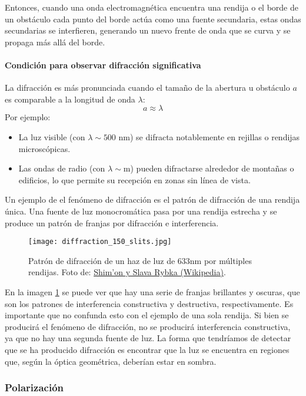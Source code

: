 Entonces, cuando una onda electromagnética encuentra una rendija o el borde de un obstáculo cada punto del borde actúa como una fuente secundaria, estas ondas secundarias se interfieren, generando un nuevo frente de onda que se curva y se propaga más allá del borde.

\paragraph{Condición para observar difracción significativa}

La difracción es más pronunciada cuando el tamaño de la abertura u obstáculo \(a\) es comparable a la longitud de onda \(\lambda\):
\[
a \approx \lambda
\]
Por ejemplo:
\begin{itemize}
  \item La luz visible (con \(\lambda \sim 500 \text{ nm}\)) se difracta notablemente en rejillas o rendijas microscópicas.
  \item Las ondas de radio (con \(\lambda \sim \text{m}\)) pueden difractarse alrededor de montañas o edificios, lo que permite su recepción en zonas sin línea de vista.
\end{itemize}

Un ejemplo de el fenómeno de difracción es el patrón de difracción de una rendija única. Una fuente de luz monocromática pasa por una rendija estrecha y se produce un patrón de franjas por difracción e interferencia.

\begin{figure}[ht]
  \centering
  \texttt{[image: diffraction\_150\_slits.jpg]}
  \caption{Patrón de difracción de un haz de luz de 633nm por múltiples rendijas. Foto de: \href{https://commons.wikimedia.org/w/index.php?curid=6938945}{Shim'on y Slava Rybka (Wikipedia)}.}
  \label{fig:diffraction_150_slits}
\end{figure}

En la imagen \ref{fig:diffraction_150_slits} se puede ver que hay una serie de franjas brillantes y oscuras, que son los patrones de interferencia constructiva y destructiva, respectivamente. Es importante que no confunda esto con el ejemplo de una sola rendija. Si bien se producirá el fenómeno de difracción, no se producirá interferencia constructiva, ya que no hay una segunda fuente de luz. La forma que tendríamos de detectar que se ha producido difracción es encontrar que la luz se encuentra en regiones que, según la óptica geométrica, deberían estar en sombra.

\subsubsection{Polarización}

